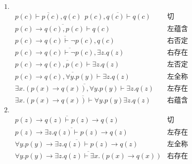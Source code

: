 \documentclass[11pt,a4paper]{article}
\begin{document}
\begin{solution}
    \begin{align*}
    1.& \\
	&\overline{p(c) \vdash p(c), q(c)} \	 \  \overline{p(c),q(c) \vdash q(c)} &\mbox{切}\\
	&\overline{p(c)\rightarrow q(c), p(c) \vdash q(c)} &\mbox{左蕴含}\\
	&\overline{p(c)\rightarrow q(c) \vdash \neg p(c), q(c)} &\mbox{右否定}\\
	&\overline{p(c)\rightarrow q(c) \vdash \neg p(c), \exists z.q(z)} &\mbox{右存在}\\
	&\overline{p(c)\rightarrow q(c), p(c) \vdash \exists z.q(z)} &\mbox{左否定}\\
	&\overline{p(c)\rightarrow q(c), \forall y.p(y) \vdash \exists z.q(z)} &\mbox{左全称}\\
	&\overline{\exists x.(p(x)\rightarrow q(x)), \forall y.p(y) \vdash \exists z.q(z)} &\mbox{左存在}\\
	&\overline{\exists x.(p(x)\rightarrow q(x)) \vdash \forall y.p(y) \exists z.q(z)} &\mbox{右蕴含}\\
	2.& \\
	&\overline{p(z)\rightarrow q(z)\vdash p(z)\rightarrow q(z)} &\mbox{切} \\
	&\overline{p(z)\rightarrow \exists z.q(z)\vdash p(z)\rightarrow q(z)} &\mbox{左存在} \\
	&\overline{\forall y.p(y)\rightarrow \exists z.q(z)\vdash p(z)\rightarrow q(z)} &\mbox{左全称} \\
	&\overline{\forall y.p(y)\rightarrow \exists z.q(z)\vdash \exists x.(p(x)\rightarrow q(x))} &\mbox{右存在} \\
	\end{align*}
\end{solution}
\end{document}
